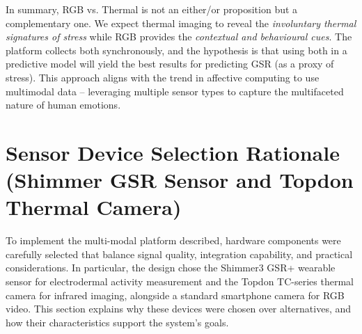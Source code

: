 In summary, RGB vs. Thermal is not an either/or proposition but a complementary one. We expect thermal imaging to reveal the \emph{involuntary thermal signatures of stress} while RGB provides the \emph{contextual and behavioural cues}. The platform collects both synchronously, and the hypothesis is that using both in a predictive model will yield the best results for predicting GSR (as a proxy of stress). This approach aligns with the trend in affective computing to use multimodal data -- leveraging multiple sensor types to capture the multifaceted nature of human emotions.

\section{Sensor Device Selection Rationale (Shimmer GSR Sensor and Topdon Thermal Camera)}
To implement the multi-modal platform described, hardware components were carefully selected that balance signal quality, integration capability, and practical considerations. In particular, the design chose the Shimmer3 GSR+ wearable sensor for electrodermal activity measurement and the Topdon TC-series thermal camera for infrared imaging, alongside a standard smartphone camera for RGB video. This section explains why these devices were chosen over alternatives, and how their characteristics support the system's goals.

